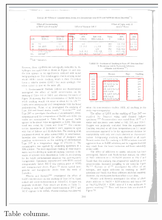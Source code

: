\begin{figure}
\begin{subfigure}{0.30\textwidth}
\includegraphics[width=\linewidth]{img/tableDetection/tableDetectionTabCols.pdf}
\caption{Table columns.}
\label{fig:tessTableDet4}
\end{subfigure}
\quad
\begin{subfigure}{0.30\textwidth}

\end{subfigure}
\end{figure}
